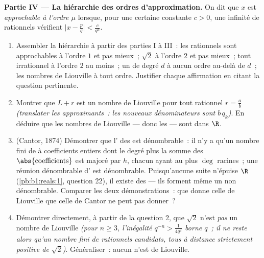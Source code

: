 \begin{problem}
\medskip
\noindent\textbf{Partie IV --- La hiérarchie des ordres
d'approximation.} On dit que $x$ est \emph{approchable à l'ordre $\mu$} lorsque,
pour une certaine constante $c > 0$, une infinité de rationnels vérifient
$\bigl|x - \frac pq\bigr| < \frac{c}{q^{\mu}}$.
\begin{enumerate}[resume]
  \item Assembler la hiérarchie à partir des parties I à III~: les rationnels sont
        approchables à l'ordre $1$ et pas mieux~; $\sqrt 2$ à
        l'ordre $2$ et pas mieux~; tout irrationnel à l'ordre
        $2$ au moins~; un  de degré $d$ à aucun ordre
        au-delà de $d$~; les nombres de Liouville à tout ordre. Justifier
        chaque affirmation en citant la question pertinente.
  \item Montrer que $L + r$ est un nombre de Liouville pour tout
        rationnel $r = \frac ab$ \emph{(translater les
        approximants~: les nouveaux dénominateurs sont $b\,q_k$)}.
        En déduire que les nombres de Liouville --- donc les  --- sont  dans $\R$.
  \item (Cantor, 1874) Démontrer que l' des 
        est dénombrable~: il n'y a qu'un nombre fini de  à
        coefficients entiers dont le degré plus la somme des $\abs{\text{coefficients}}$
        est majoré par $h$, chacun ayant au plus $\deg$ racines~; une
        réunion dénombrable d' est dénombrable. Puisqu'aucune
        suite n'épuise $\R$ (\cref{pb:b1:reals:1}, question
        22), il existe des  --- ils forment même un
         non dénombrable. Comparer les deux démonstrations~: que donne
        celle de Liouville que celle de Cantor ne peut pas donner~?
  \item Démontrer directement, à partir de la question 2, que $\sqrt 2$ n'est
        \emph{pas} un nombre de Liouville \emph{(pour $n \geq 3$,
        l'inégalité $q^{-n} > \frac{1}{4q^2}$ borne $q$~;
        il ne reste alors qu'un nombre fini de rationnels candidats, tous
        à distance strictement positive de $\sqrt2$)}. Généraliser~:
        aucun  n'est de Liouville.
\end{enumerate}


\end{problem}
